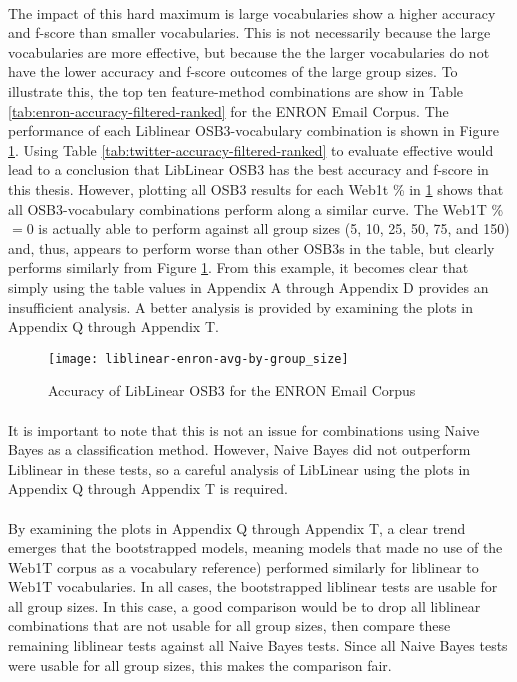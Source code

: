 	\paragraph*{} The impact of this hard maximum is large vocabularies show a higher accuracy and f-score than smaller vocabularies.  This is not necessarily because the large vocabularies are more effective, but because the the larger vocabularies do not have the lower accuracy and f-score outcomes of the large group sizes.  To illustrate this, the top ten feature-method combinations are show in Table \ref{tab:enron-accuracy-filtered-ranked} for the ENRON Email Corpus.  The performance of each Liblinear OSB3-vocabulary combination is shown in Figure \ref{fig:plot-liblinear-enron-accuracy}. Using Table \ref{tab:twitter-accuracy-filtered-ranked} to evaluate effective would lead to a conclusion that LibLinear OSB3 has the best accuracy and f-score in this thesis.  However, plotting all OSB3 results for each Web1t \%  in \ref{fig:plot-liblinear-enron-accuracy} shows that all OSB3-vocabulary combinations perform along a similar curve.  The Web1T \% $= 0$ is actually able to perform against all group sizes (5, 10, 25, 50, 75, and 150) and, thus, appears to perform worse than other OSB3s in the table, but clearly performs similarly from Figure \ref{fig:plot-liblinear-enron-accuracy}.  From this example, it becomes clear that simply using the table values in Appendix A through Appendix D provides an insufficient analysis.  A better analysis is provided by examining the plots in Appendix Q through Appendix T.  
	
\begin{figure}[htbp!]
	\centering
	\texttt{[image: liblinear-enron-avg-by-group\_size]}
	\caption{Accuracy of LibLinear OSB3 for the ENRON Email Corpus}
	\label{fig:plot-liblinear-enron-accuracy}
\end{figure}
	
	\paragraph*{}It is important to note that this is not an issue for combinations using Naive Bayes as a classification method.  However, Naive Bayes did not outperform Liblinear in these tests, so a careful analysis of LibLinear using the plots in Appendix Q through Appendix T is required.

	\paragraph*{} By examining the plots in Appendix Q through Appendix T, a clear trend emerges that the bootstrapped models, meaning models that made no use of the Web1T corpus as a vocabulary reference) performed similarly for liblinear to Web1T vocabularies.  In all cases, the bootstrapped liblinear tests are usable for all group sizes.  In this case, a good comparison would be to drop all liblinear combinations that are not usable for all group sizes, then compare these remaining liblinear tests against all Naive Bayes tests.  Since all Naive Bayes tests were usable for all group sizes, this makes the comparison fair.
	
